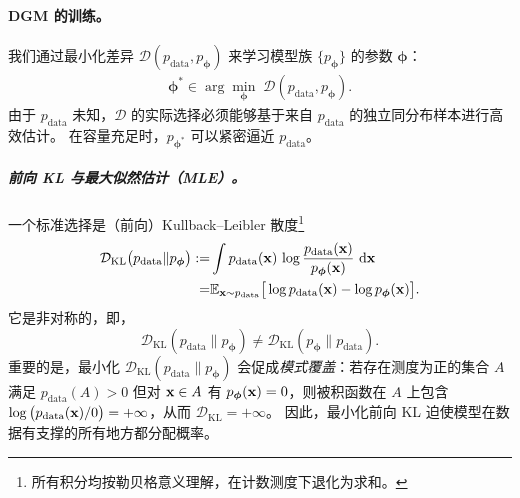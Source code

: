 

\paragraph{DGM 的训练。}
我们通过最小化差异 $\mathcal{D}(p_{\mathrm{data}},p_{\bm{\phi}})$ 来学习模型族 $\{p_{\bm{\phi}}\}$ 的参数 $\bm{\phi}$：
\begin{align}\label{eq:dgm-optimization}
  \bm{\phi}^\ast \in \arg\min_{\bm{\phi}}\; \mathcal{D}(p_{\mathrm{data}},p_{\bm{\phi}}).
\end{align}
由于 $p_{\mathrm{data}}$ 未知，$\mathcal{D}$ 的实际选择必须能够基于来自 $ p_{\mathrm{data}} $ 的独立同分布样本进行高效估计。
在容量充足时，$p_{\bm{\phi}^\ast}$ 可以紧密逼近 $p_{\mathrm{data}}$。

\subparagraph{前向 KL 与最大似然估计（MLE）。}
一个标准选择是（前向）Kullback--Leibler 散度\footnote{所有积分均按勒贝格意义理解，在计数测度下退化为求和。}
\begin{align*}
\mathcal{D}_{\mathrm{KL}} \big(p_{\mathrm{data}}\|p_{\bm{\phi}}\big)
  := &\int p_{\mathrm{data}}({\mathbf{x}})\,\log\frac{p_{\mathrm{data}}({\mathbf{x}})}{p_{\bm{\phi}}({\mathbf{x}})}\,\mathop{}\!\mathrm{d} {\mathbf{x}} \\
  = &\mathbb{E}_{{\mathbf{x}}\sim p_{\mathrm{data}}} \big[\log p_{\mathrm{data}}({\mathbf{x}})-\log p_{\bm{\phi}}({\mathbf{x}})\big].
\end{align*}
它是非对称的，即，
\[
\mathcal{D}_{\mathrm{KL}}(p_{\mathrm{data}} \| p_{\bm{\phi}}) \neq \mathcal{D}_{\mathrm{KL}}(p_{\bm{\phi}} \| p_{\mathrm{data}}).
\]重要的是，最小化 $\mathcal{D}_{\mathrm{KL}}(p_{\mathrm{data}} \| p_{\bm{\phi}})$ 会促成\emph{模式覆盖}：若存在测度为正的集合 $A$ 满足 $p_{\mathrm{data}}(A)>0$ 但对 ${\mathbf{x}}\in A$ 有 $p_{\bm{\phi}}({\mathbf{x}})=0$，则被积函数在 $A$ 上包含
$\log \big(p_{\mathrm{data}}({\mathbf{x}})/0\big)=+\infty$，从而 $\mathcal{D}_{\mathrm{KL}}=+\infty$。
因此，最小化前向 KL 迫使模型在数据有支撑的所有地方都分配概率。


